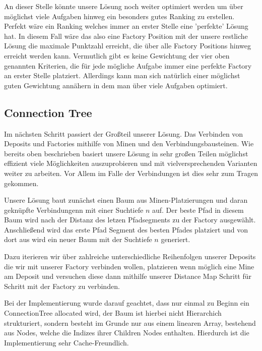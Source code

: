 \documentclass[12pt,a4paper]{article}
\begin{document}
An dieser Stelle könnte unsere Lösung noch weiter optimiert werden um über möglichst viele Aufgaben hinweg ein besonders gutes Ranking zu erstellen. Perfekt wäre ein Ranking welches immer an erster Stelle eine 'perfekte' Lösung hat. In diesem Fall wäre das also eine Factory Position mit der unsere restliche Lösung die maximale Punktzahl erreicht, die über alle Factory Positions hinweg erreicht werden kann. Vermutlich gibt es keine Gewichtung der vier oben genannten Kriterien, die für jede mögliche Aufgabe immer eine perfekte Factory an erster Stelle platziert. Allerdings kann man sich natürlich einer möglichst guten Gewichtung annähern in dem man über viele Aufgaben optimiert.

\subsection{Connection Tree}
Im nächsten Schritt passiert der Großteil unserer Lösung. Das Verbinden von Deposits und Factories mithilfe von Minen und den Verbindungsbausteinen. Wie bereits oben beschrieben basiert unsere Lösung in sehr großen Teilen möglichst effizient viele Möglichkeiten auszuprobieren und mit vielversprechenden Varianten weiter zu arbeiten. Vor Allem im Falle der Verbindungen ist dies sehr zum Tragen gekommen.

Unsere Lösung baut zunächst einen Baum aus Minen-Platzierungen und daran geknüpfte Verbindungenn mit einer Suchtiefe $n$ auf. Der beste Pfad in diesem Baum wird nach der Distanz des letzen Pfadsegments zu der Factory ausgewählt. Anschließend wird das erste Pfad Segment des besten Pfades platziert und von dort aus wird ein neuer Baum mit der Suchtiefe $n$ generiert.

Dazu iterieren wir über zahlreiche unterschiedliche Reihenfolgen unserer Deposits die wir mit unserer Factory verbinden wollen, platzieren wenn möglich eine Mine am Deposit und versuchen diese dann mithilfe unserer Distance Map Schritt für Schritt mit der Factory zu verbinden.

Bei der Implementierung wurde darauf geachtet, dass nur einmal zu Beginn ein ConnectionTree allocated wird, der Baum ist hierbei nicht Hierarchich strukturiert, sondern besteht im Grunde nur aus einem linearen Array, bestehend aus Nodes, welche die Indizes ihrer Children Nodes enthalten. Hierdurch ist die Implementierung sehr Cache-Freundlich.


\newpage
\end{document}
